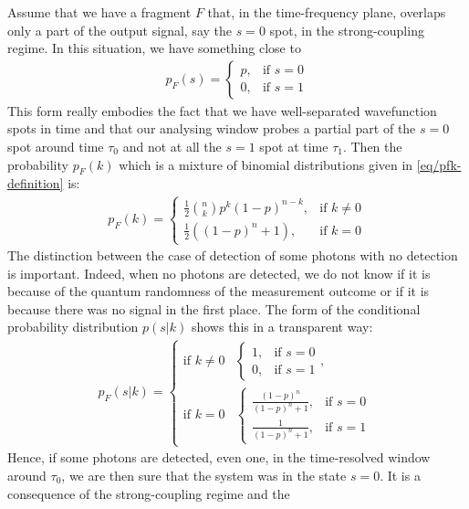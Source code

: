 \begin{example}
Assume that we have a fragment $F$ that, in the time-frequency plane,
overlaps only a part of the output signal, say the $s=0$ spot, in the strong-coupling
regime. In this situation, we have something close to
%
\begin{align}
p_F(s) = 
\begin{cases}
    p, & \text{if } s=0 \\
    0, & \text{if } s=1
\end{cases}
\end{align}
This form really embodies the fact that we have well-separated
wavefunction spots in time and that our analysing window probes a partial
part of the $s=0$ spot around time $\tau_0$ and not at all the $s=1$ spot
at time $\tau_1$. Then the probability $p_F(k)$ which is a mixture of 
binomial distributions given in \cref{eq/pfk-definition} is:
%
\begin{align}
p_F(k) = 
\begin{cases}
    \frac{1}{2} \binom{n}{k}p^k(1-p)^{n-k}, & \text{if } k \ne 0 \\
    \frac{1}{2}((1-p)^n + 1), & \text{if } k=0
\end{cases}
\end{align}
The distinction between the case of detection of some photons with no
detection is important. Indeed, when no photons are detected, we do not
know if it is because of the quantum randomness of the measurement outcome
or if it is because there was no signal in the first place.
The form of the conditional probability distribution $p(s|k)$ shows this
in a transparent way:
%
\begin{align}
p_F(s|k) = 
\begin{cases}
\text{if } k \ne 0 &
   	\begin{cases} 
	1, & \text{if } s=0 \\
	0, & \text{if } s=1
	\end{cases}, 
\\
\text{if } k = 0 &
   	\begin{cases} 
	\frac{(1-p)^n}{(1-p)^n + 1}, & \text{if } s=0 \\
	\frac{1}{(1-p)^n + 1}, & \text{if } s=1
	\end{cases}
\end{cases}
\end{align}
Hence, if some photons are detected, even one, in the time-resolved
window around $\tau_0$, we are then sure that the system was in the
state $s=0$. It is a consequence of the strong-coupling regime and the

\end{example}
